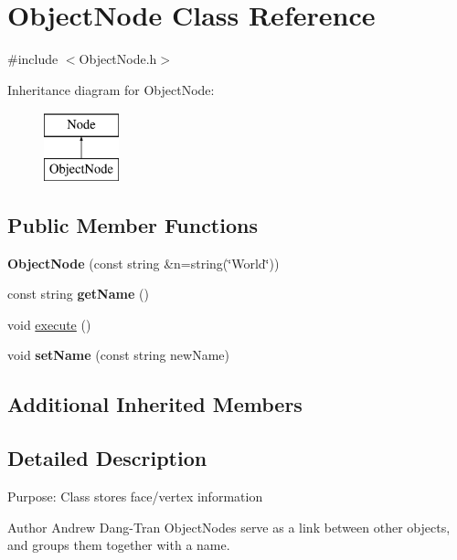 \hypertarget{classObjectNode}{\section{Object\-Node Class Reference}
\label{classObjectNode}
}


{\ttfamily \#include $<$Object\-Node.\-h$>$}

Inheritance diagram for Object\-Node\-:\begin{figure}[H]
\begin{center}
\leavevmode
\includegraphics[height=2.000000cm]{classObjectNode}
\end{center}
\end{figure}
\subsection*{Public Member Functions}
\begin{DoxyCompactItemize}
\item 
\hypertarget{classObjectNode_aa63236a1b5905933b88383383e7f1964}{{\bfseries Object\-Node} (const string \&n=string(\char`\"{}World\char`\"{}))}\label{classObjectNode_aa63236a1b5905933b88383383e7f1964}

\item 
\hypertarget{classObjectNode_a3743ff7e3b278d3498bf2db020bcfd32}{const string {\bfseries get\-Name} ()}\label{classObjectNode_a3743ff7e3b278d3498bf2db020bcfd32}

\item 
void \hyperlink{classObjectNode_ab354580ede8a53ea2986b9a5251849fa}{execute} ()
\item 
\hypertarget{classObjectNode_a478bf4eb8026b01fcafa73e5346ceed8}{void {\bfseries set\-Name} (const string new\-Name)}\label{classObjectNode_a478bf4eb8026b01fcafa73e5346ceed8}

\end{DoxyCompactItemize}
\subsection*{Additional Inherited Members}


\subsection{Detailed Description}
Purpose\-: Class stores face/vertex information \begin{DoxyAuthor}{Author}
Andrew Dang-\/\-Tran Object\-Nodes serve as a link between other objects, and groups them together with a name. 
\end{DoxyAuthor}


